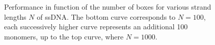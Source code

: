 \begin{figure}[htb]
       \begin{center}
               \scalebox{0.9}{
                        \nonstopmode
                        
                        \errorstopmode
                        \rule[-0.5cm]{0cm}{0cm}}
                \caption{Performance in function of the number of boxes for various strand lengths $N$ of ssDNA. The bottom curve corresponds to $N = 100$, each successively higher curve represents an additional 100 monomers, up to the top curve, where $N = 1000$.}
                \label{performancePerNumBox}
        \end{center}
\end{figure}

